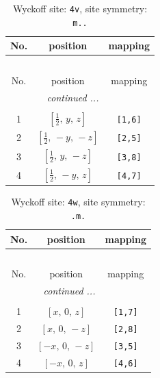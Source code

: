 \documentclass[fleqn,8pt]{jsarticle}
\begin{document}
\begin{longtable}{ccc}
\caption{Wyckoff site: {\tt 4v}, site symmetry: {\tt m..}}
 \\
 \hline \hline
No. & position & mapping \\ \hline \endfirsthead

\multicolumn{2}{l}{\tablename\ \thetable{}} \\
 \hline \hline
No. & position & mapping \\ \hline \endhead

 \hline \hline
\multicolumn{2}{r}{\footnotesize\it continued ...} \\ \endfoot

 \hline \hline
\multicolumn{2}{r}{} \\ \endlastfoot

1 & $\left[ \frac{1}{2},\, y,\, z \right]$ & {\tt [1,6]} \\ \hline
2 & $\left[ \frac{1}{2},\, - y,\, - z \right]$ & {\tt [2,5]} \\ \hline
3 & $\left[ \frac{1}{2},\, y,\, - z \right]$ & {\tt [3,8]} \\ \hline
4 & $\left[ \frac{1}{2},\, - y,\, z \right]$ & {\tt [4,7]} \\
\end{longtable}
\renewcommand{\arraystretch}{1.2}
\begin{longtable}{ccc}
\caption{Wyckoff site: {\tt 4w}, site symmetry: {\tt .m.}}
 \\
 \hline \hline
No. & position & mapping \\ \hline \endfirsthead

\multicolumn{2}{l}{\tablename\ \thetable{}} \\
 \hline \hline
No. & position & mapping \\ \hline \endhead

 \hline \hline
\multicolumn{2}{r}{\footnotesize\it continued ...} \\ \endfoot

 \hline \hline
\multicolumn{2}{r}{} \\ \endlastfoot

1 & $\left[ x,\, 0,\, z \right]$ & {\tt [1,7]} \\ \hline
2 & $\left[ x,\, 0,\, - z \right]$ & {\tt [2,8]} \\ \hline
3 & $\left[ - x,\, 0,\, - z \right]$ & {\tt [3,5]} \\ \hline
4 & $\left[ - x,\, 0,\, z \right]$ & {\tt [4,6]} \\
\end{longtable}
\end{document}
